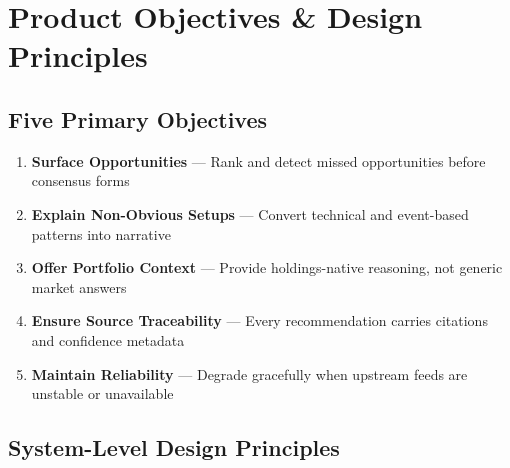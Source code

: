 \documentclass[11pt,a4paper]{article}
\begin{document}
\section{Product Objectives \& Design Principles}

\subsection{Five Primary Objectives}

\begin{enumerate}[label={\color{mn-blue}\textbf{OBJ\arabic*}}, leftmargin=1.8cm, itemsep=0.4cm]
    \item \textbf{Surface Opportunities} — Rank and detect missed opportunities before consensus forms
    \item \textbf{Explain Non-Obvious Setups} — Convert technical and event-based patterns into narrative
    \item \textbf{Offer Portfolio Context} — Provide holdings-native reasoning, not generic market answers
    \item \textbf{Ensure Source Traceability} — Every recommendation carries citations and confidence metadata
    \item \textbf{Maintain Reliability} — Degrade gracefully when upstream feeds are unstable or unavailable
\end{enumerate}

\subsection{System-Level Design Principles}
\end{document}
